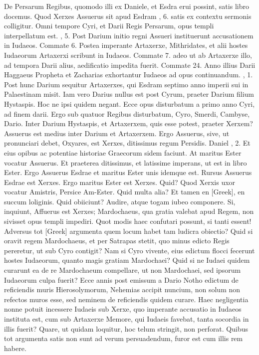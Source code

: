 De Persarum Regibus, quomodo illi ex Daniele,
 et Esdra erui possint,
satis libro  docemus.
Quod Xerxes Assuerus sit apud Esdram
, 6. satis ex contextu sermonis colligitur.
Omni tempore
Cyri, et Darii Regis Persarum, opus templi interpellatum est.
, 5.
Post Darium initio regni Assueri instituerunt accusationem
in Iudaeos.
Commate 6.
Postea imperante Artaxerxe, Mithridates,
et alii hostes Iudaeorum Artaxerxi scribunt in Iudaeos.
Commate 7.
adeo ut ab Artaxerxe illo, ad tempora Darii alius, aedificatio impedita
fuerit.
Commate 24.
Anno illius Darii Haggaeus Propheta
et Zacharias exhortantur Iudaeos ad opus continuandum.
, 1.
Post hunc Darium sequitur Artaxerxes, qui Esdram septimo anno
imperii sui in Palaestinam misit.
Iam vero Darius nullus est post Cyrum,
praeter Darium filium Hystaspis.
Hoc ne ipsi quidem negant.
Ecce opus disturbatum a primo anno Cyri, ad finem darii.
Ergo sub quatuor Regibus disturbatum, Cyro, Smerdi, Cambyse,
Dario.
Inter Darium Hystaspis, et Artaxerxem, quis esse potest,
praeter Xerxem?
Assuerus est medius inter Darium et Artaxerxem.
Ergo Assuerus, sive, ut pronunciari debet, Oxyares,
 est Xerxes, ditissimus
regum Persidis.
Daniel , 2.
Et eius opibus ac potentiae historiae
Graecorum sidem faciunt.
At maritus Ester vocatur Assuerus.
Et praeterea ditissimus, et latissime imperans, ut est in libro
Ester.
Ergo Assuerus Esdrae et maritus Ester unis idemque est.
Rursus Assuerus Esdrae est Xerxes.
Ergo maritus Ester est Xerxes.
Quid?
Quod Xerxis uxor vocatur Amistris, Persice Am-Ester.
Quid multa alia?
Et tamen en \textgreek{[Greek]}, en succum loliginis.
Quid obiiciunt?
Audire, atque togam iubeo componere.
Si, inquiunt, Affuerus est Xerxes;
Mardochaeus, qua gratia valebat apud Regem, non sivisset opus
templi impediri.
Quot modis haec confutari possunt, si tanti essent!
Adversus tot \textgreek{[Greek]} argumenta quem locum
 habet tam ludicra obiectio?
Quid si oravit regem Mardochaeus, et per Satrapas stetit, quo
minus edicto Regis pereretur, ut sub Cyro contigit?
Nam si Cyro vivente,
eius edictum flocci fecerunt hostes Iudaeorum, quanto magis
gratiam Mardochaei?
Quid si ne Iudaei quidem curarunt ea de re Mardochaeum
compellare, ut non Mardochaei, sed ipsorum Iudaeorum
culpa fuerit?
Ecce  annis post emissum a Dario Notho edictum
de reficiendis muris Hierosolymorum, Nehemias accipit nuncium,
non solum non refectos muros esse, sed neminem de reficiendis
quidem curare.
Haec negligentia nonne potuit incessere Iudaeis sub
Xerxe, quo imperante accusatio in Iudaeos instituta est, cum sub Artaxerxe
Memore, qui Iudaeis favebat, tanta socordia in illis fuerit?
Quare, ut quidam loquitur, hoc telum stringit, non perforat.
Quibus tot argumenta satis non sunt ad verum persuadendum, furor est
cum illis rem habere.

